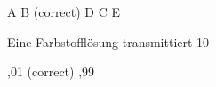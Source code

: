 \documentclass[11pt]{exam}
\begin{document}
\begin{questions}
\begin{choices}
	\choice A
	\choice B (correct)
	\choice D
	\choice C
	\choice E
\end{choices}

\vspace{3mm}\question Eine Farbstofflösung transmittiert 10 %

\begin{choices}
	,01
	 (correct)
	,99
\end{choices}

\vspace{3mm}\end{questions}
\end{document}
